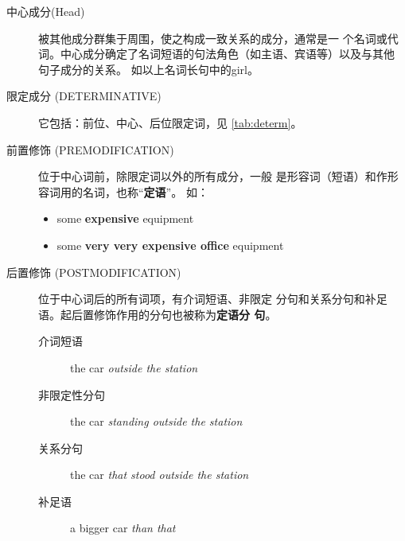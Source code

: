 \begin{description}
\item[中心成分(Head)] 被其他成分群集于周围，使之构成一致关系的成分，通常是一
  个名词或代词。中心成分确定了名词短语的句法角色（如主语、宾语等）以及与其他
  句子成分的关系。 如以上名词长句中的girl。

\item[限定成分 (DETERMINATIVE)] 它包括：前位、中心、后位限定词，见 \cref{tab:determ}。

\item[前置修饰 (PREMODIFICATION)] 位于中心词前，除限定词以外的所有成分，一般
  是形容词（短语）和作形容词用的名词，也称“\textbf{定语}”。 如：
  \begin{itemize}
  \item some \textbf{expensive} equipment
  \item some \textbf{very very expensive office} equipment
  \end{itemize}

\item[后置修饰 (POSTMODIFICATION)] 位于中心词后的所有词项，有介词短语、非限定
  分句和关系分句和补足语。起后置修饰作用的分句也被称为\textbf{定语分
    句}。 
  \begin{description}
  \item[介词短语] the car \emph{outside the station}
  \item[非限定性分句] the car \emph{standing outside the station}
  \item[关系分句] the car \emph{that stood outside the station}
  \item[补足语] a bigger car \emph{than that}
  \end{description}

\end{description}


